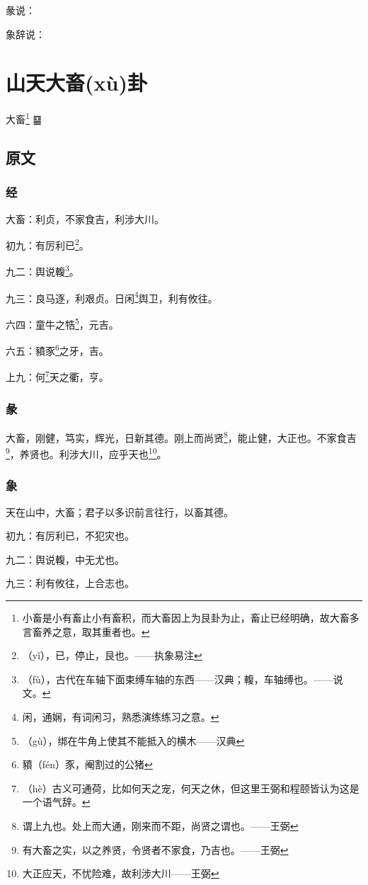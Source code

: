 \documentclass[12pt,oneside]{book}
\begin{document}
彖说：

象辞说：


\chapter{山天大畜(xù)卦}
大畜\footnote{小畜是小有畜止小有畜积，而大畜因上为艮卦为止，畜止已经明确，故大畜多言畜养之意，取其重者也。} {\Large ䷙}

\section{原文}

\subsection{经}
大畜：利贞，不家食吉，利涉大川。

初九：有厉利已\footnote{（yǐ），已，停止，艮也。——执象易注}。

九二：舆说輹\footnote{（fù），古代在车轴下面束缚车轴的东西——汉典；輹，车轴缚也。——说文。}。

九三：良马逐，利艰贞。日闲\footnote{闲，通娴，有词闲习，熟悉演练练习之意。}舆卫，利有攸往。

六四：童牛之牿\footnote{（gù），绑在牛角上使其不能抵入的横木——汉典}，元吉。

六五：豶豕\footnote{豶（fén）豕，阉割过的公猪}之牙，吉。

上九：何\footnote{（hè）古义可通荷，比如何天之宠，何天之休，但这里王弼和程颐皆认为这是一个语气辞。}天之衢，亨。

\subsection{彖}
大畜，刚健，笃实，辉光，日新其德。刚上而尚贤\footnote{谓上九也。处上而大通，刚来而不距，尚贤之谓也。——王弼}，能止健，大正也。不家食吉\footnote{有大畜之实，以之养贤，令贤者不家食，乃吉也。——王弼}，养贤也。利涉大川，应乎天也\footnote{大正应天，不忧险难，故利涉大川——王弼}。

\subsection{象}
天在山中，大畜；君子以多识前言往行，以畜其德。

初九：有厉利已，不犯灾也。

九二：舆说輹，中无尤也。

九三：利有攸往，上合志也。
\end{document}
